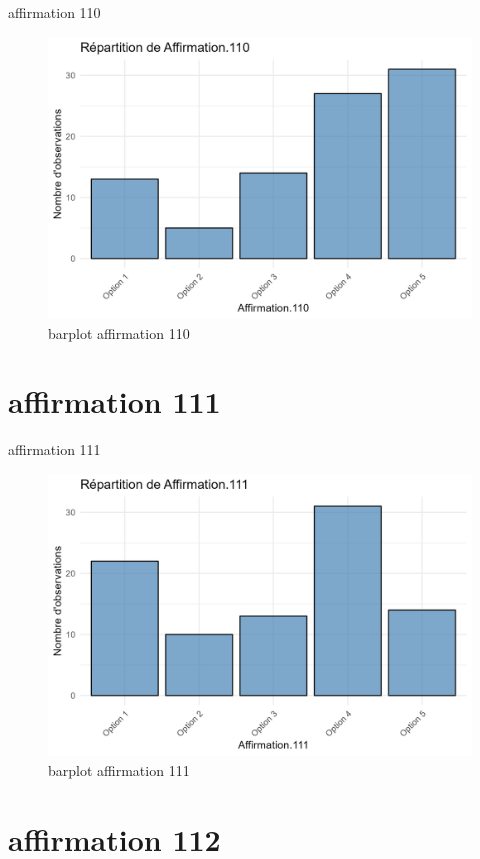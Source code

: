 \documentclass[
]{article}
\begin{document}
affirmation 110

\begin{figure}
\centering
\includegraphics{Image/barplot_Affirmation.110.png}
\caption{barplot affirmation 110}
\end{figure}

\section{affirmation 111}\label{affirmation-111}

affirmation 111

\begin{figure}
\centering
\includegraphics{Image/barplot_Affirmation.111.png}
\caption{barplot affirmation 111}
\end{figure}

\section{affirmation 112}\label{affirmation-112}
\end{document}

